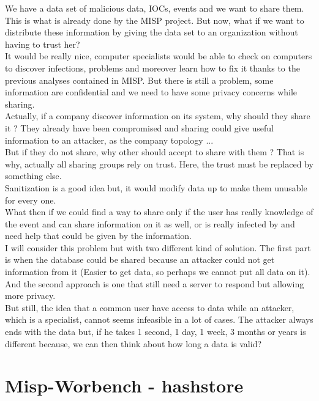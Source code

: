 \documentclass{eplmastersthesis}
\begin{document}
We have a data set of malicious data, IOCs, events and we want to share them. This is what is already done by the MISP project. But now, what if we want to distribute these information by giving the data set to an organization without having to trust her?\\
It would be really nice, computer specialists would be able to check on computers to discover infections, problems and moreover learn how to fix it thanks to the previous analyses contained in MISP. But there is still a problem, some information are confidential and we need to have some privacy concerns while sharing. \\
Actually, if a company discover information on its system, why should they share it ? They already have been compromised and sharing could give useful information to an attacker, as the company topology ... \\
But if they do not share, why other should accept to share with them ? That is why, actually all sharing groups rely on trust. Here, the trust must be replaced by something else.\\
Sanitization is a good idea but, it would modify data up to make them unusable for every one.\\
What then if we could find a way to share only if the user has really knowledge of the event and can share information on it as well, or is really infected by and need help that could be given by the information.\\
I will consider this problem but with two different kind of solution. The first part is when the database could be shared because an attacker could not get information from it (Easier to get data, so perhaps we cannot put all data on it).\\
And the second approach is one that still need a server to respond but allowing more privacy.\\

But still, the idea that a common user have access to data while an attacker, which is a specialist, cannot seems infeasible in a lot of cases. The attacker always ends with the data but, if he takes 1 second, 1 day, 1 week, 3 months or years is different because, we can then think about how long a data is valid? \\



\section{Misp-Worbench - hashstore}
\end{document}
